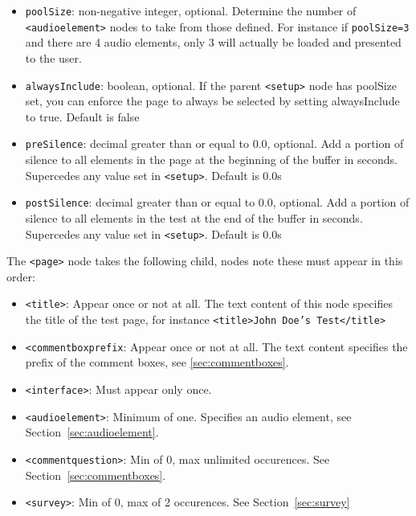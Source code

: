 \documentclass[11pt, oneside]{article}   	%
\begin{document}
\begin{itemize}
\begin{itemize}
            \end{itemize}
            \item \texttt{poolSize}: non-negative integer, optional. Determine the number of \texttt{<audioelement>} nodes to take from those defined. For instance if \texttt{poolSize=3} and there are 4 audio elements, only 3 will actually be loaded and presented to the user.
            \item \texttt{alwaysInclude}: boolean, optional. If the parent \texttt{<setup>} node has poolSize set, you can enforce the page to always be selected by setting alwaysInclude to true. Default is false
             \item \texttt{preSilence}: decimal greater than or equal to 0.0, optional. Add a portion of silence to all elements in the page at the beginning of the buffer in seconds. Supercedes any value set in \texttt{<setup>}. Default is 0.0s
            \item \texttt{postSilence}: decimal greater than or equal to 0.0, optional. Add a portion of silence to all elements in the test at the end of the buffer in seconds. Supercedes any value set in \texttt{<setup>}. Default is 0.0s
            
        \end{itemize}
        
        The \texttt{<page>} node takes the following child, nodes note these must appear in this order:
        \begin{itemize}
            \item \texttt{<title>}: Appear once or not at all. The text content of this node specifies the title of the test page, for instance \texttt{<title>John Doe's Test</title>}
            \item \texttt{<commentboxprefix}: Appear once or not at all. The text content specifies the prefix of the comment boxes, see \ref{sec:commentboxes}.
            \item \texttt{<interface>}: Must appear only once.
            \item \texttt{<audioelement>}: Minimum of one. Specifies an audio element, see Section~\ref{sec:audioelement}.
            \item \texttt{<commentquestion>}: Min of 0, max unlimited occurences. See Section~\ref{sec:commentboxes}.
            \item \texttt{<survey>}: Min of 0, max of 2 occurences. See Section~\ref{sec:survey}
        \end{itemize}
\end{document}
